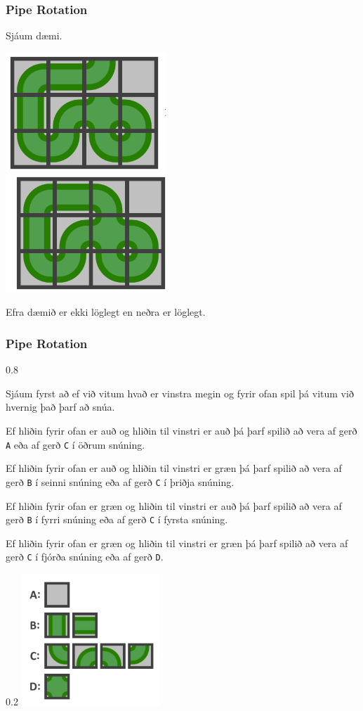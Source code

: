 {
	\frametitle{Pipe Rotation}
	{
		\item<1-> Sjáum dæmi.
		\item<2->[] \includegraphics[scale = 0.25]{fig/pr2}
		\item<3-> Efra dæmið er ekki löglegt en neðra er löglegt.
	}
}

{
	\frametitle{Pipe Rotation}
	{
		{
			{0.8\textwidth}
			{
				\item<1-> Sjáum fyrst að ef við vitum hvað er vinstra megin og fyrir ofan spil þá vitum við hvernig það þarf að snúa.
				\item<2-> Ef hliðin fyrir ofan er auð og hliðin til vinstri er auð þá þarf spilið að vera af gerð \texttt{A}
							eða af gerð \texttt{C} í öðrum snúning.
				\item<3-> Ef hliðin fyrir ofan er auð og hliðin til vinstri er græn þá þarf spilið að vera af gerð \texttt{B} í seinni snúning
							eða af gerð \texttt{C} í þriðja snúning.
				\item<4-> Ef hliðin fyrir ofan er græn og hliðin til vinstri er auð þá þarf spilið að vera af gerð \texttt{B} í fyrri snúning
							eða af gerð \texttt{C} í fyrsta snúning.
				\item<5-> Ef hliðin fyrir ofan er græn og hliðin til vinstri er græn þá þarf spilið að vera af gerð \texttt{C} í fjórða snúning
							eða af gerð \texttt{D}.
			}
		}
		{
			{0.2\textwidth}
			\includegraphics[scale = 0.3]{fig/pr1}
		}
	}
}

